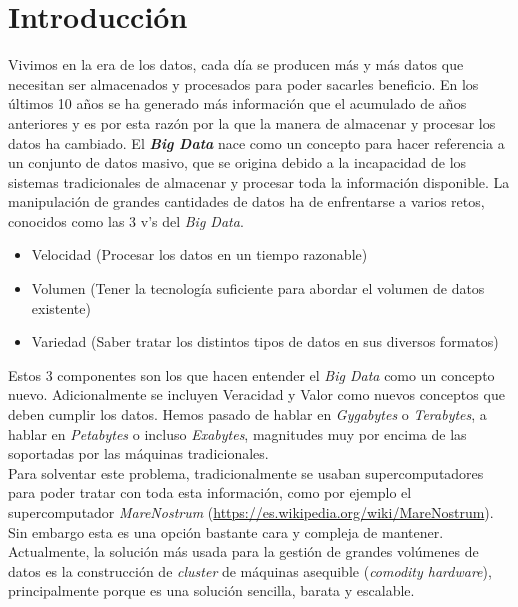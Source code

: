 \chapter*{Introducción}%

Vivimos en la era de los datos, cada día se producen más y más datos que
necesitan ser almacenados y procesados para poder sacarles beneficio.
En los últimos 10 años se ha generado más información que el acumulado de años
anteriores y es por esta razón  por la que la manera de almacenar y procesar
los datos ha cambiado.
El \textbf{\textit{Big Data}}\label{big_data_def} nace como un concepto para hacer referencia a un 
conjunto de datos masivo, que se origina debido a la incapacidad de los sistemas tradicionales 
de almacenar y procesar toda la información disponible.
La manipulación de grandes cantidades de datos ha de enfrentarse a varios
retos, conocidos como las 3 v's del \textit{Big Data}.
\begin{itemize}
  \item Velocidad (Procesar los datos en un tiempo razonable)
  \item Volumen (Tener la tecnología suficiente para abordar el volumen de datos existente)
  \item Variedad (Saber tratar los distintos tipos de datos en sus diversos formatos)
\end{itemize}
Estos 3 componentes son los que hacen entender el \textit{Big Data} como un 
concepto nuevo. Adicionalmente se incluyen Veracidad y Valor como nuevos conceptos que deben cumplir los datos.
Hemos pasado de hablar en \textit{Gygabytes} o \textit{Terabytes}, a hablar 
en \textit{Petabytes} o incluso \textit{Exabytes}, magnitudes muy por encima de las soportadas 
por las máquinas tradicionales.\\
Para solventar este problema, tradicionalmente se usaban supercomputadores para poder tratar con toda esta
información, como por ejemplo el supercomputador \textit{MareNostrum} (\url{https://es.wikipedia.org/wiki/MareNostrum}). 
Sin embargo esta es una opción bastante cara y compleja de mantener. Actualmente, la solución más
usada para la gestión de grandes volúmenes de datos es la construcción de \textit{cluster} de máquinas asequible
(\textit{comodity hardware}), principalmente porque es una solución sencilla, barata y
escalable.

